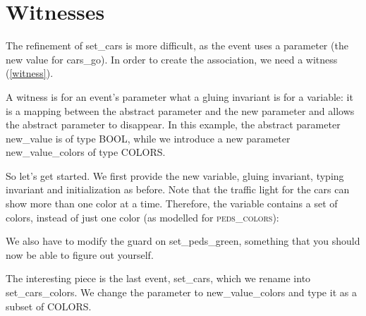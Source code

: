 \section{Witnesses}

The refinement of \textsf{set\_cars} is more difficult, as the event uses a parameter (the new value for \textsf{cars\_go}).  In order to create the association, we need a witness (\ref{witness}).

A witness is for an event's parameter what a gluing invariant is for a variable: it is a mapping between the abstract parameter and the new parameter and allows the abstract parameter to disappear.  In this example, the abstract parameter \textsf{new\_value} is of type \textsf{BOOL}, while we introduce a new parameter \textsf{new\_value\_colors} of type \textsf{COLORS}.


So let's get started.  We first provide the new variable, gluing invariant, typing invariant and initialization as before.  Note that the traffic light for the cars can show more than one color at a time.  Therefore, the variable contains a set of colors, instead of just one color (as modelled for \textsc{peds\_colors}):


We also have to modify the guard on \textsf{set\_peds\_green}, something that you should now be able to figure out yourself.

The interesting piece is the last event, \textsf{set\_cars}, which we rename into \textsf{set\_cars\_colors}.  We change the parameter to \textsf{new\_value\_colors} and type it as a subset of \textsf{COLORS}.

